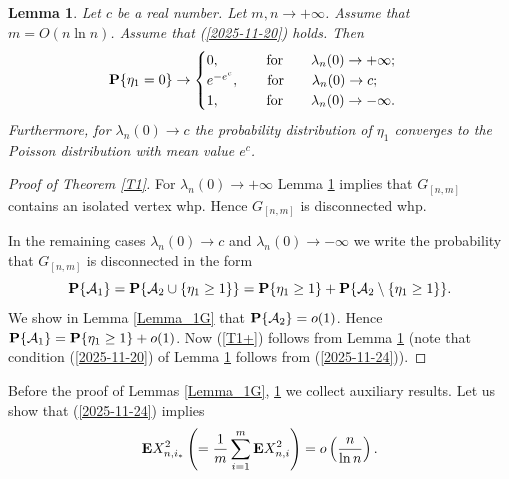 \documentclass[11pt, a4paper]{article}
\newcommand{\E}{{\bf{E}}}
\newcommand{\PP}{{\bf{P}}}
\newtheorem{lem}{Lemma}
\begin{document}
\begin{lem}\label{Lemma_2} 
Let $c$ be a real number.
Let 
$m,n\to+\infty$.
Assume that $m=O(n\ln n)$. Assume that (\ref{2025-11-20})
holds. Then  
\begin{align}
\label{2025-11-20+6}
\PP\{\eta_1=0\}
\to
\begin{cases}
0,
\qquad
\quad
\
{\text{for}}
\qquad
\lambda_{n}(0)
\to +\infty;
\\
e^{-e^c},
\qquad
{\text{for}}
\qquad
\lambda_{n}(0)
\to c;
\\
1,
\qquad
\quad
\
{\text{for}}
\qquad
\lambda_{n}(0)
\to -\infty.
\end{cases}
\end{align}
Furthermore, for $\lambda_{n}(0)\to c$ 
the probability distribution of $\eta_1$ converges 
to  the Poisson distribution with mean value $e^{c}$.
\end{lem} 


\begin{proof}[Proof of Theorem \ref{T1}]
For $\lambda_{n}(0)\to+\infty$ Lemma \ref{Lemma_2}
implies that $G_{[n,m]}$ contains an isolated vertex whp.
Hence $G_{[n,m]}$ is disconnected whp.

In the  remaining cases $\lambda_{n}(0)\to c$ and $\lambda_{n}(0)\to-\infty$ we write
 the probability that $G_{[n,m]}$ is disconnected in the form
\begin{displaymath}
\PP\{{\cal A}_1\}=\PP\{{\cal A}_2\cup\{\eta_1\ge 1\}\}
=\PP\{\eta_1\ge 1\}
+\PP\{{\cal A}_2\setminus \{\eta_1\ge 1\}\}.
\end{displaymath}
We show in Lemma 
\ref{Lemma_1G}  that 
$\PP\{{\cal A}_2\}=o(1)$. Hence 
$\PP\{{\cal A}_1\}
=\PP\{\eta_1\ge 1\}+o(1)$.
Now (\ref{T1+}) follows from Lemma \ref{Lemma_2} (note that condition (\ref{2025-11-20}) of Lemma \ref{Lemma_2}
follows from (\ref{2025-11-24})).
\end{proof}




Before the proof  of Lemmas \ref{Lemma_1G}, \ref{Lemma_2} we
collect auxiliary results. 
Let us show that (\ref{2025-11-24}) implies
\begin{align}
\label{2025-11-20}
\E X_{n,i_*}^2
\left(= \frac{1}{m}\sum_{i=1}^m\E X^2_{n,i}
\right)
=
o\left(\frac{n}{\ln n}\right).
\end{align}
\end{document}
